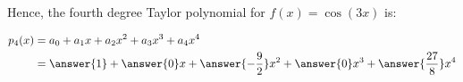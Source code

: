 \documentclass{ximera}
\begin{document}
\begin{exercise}
\begin{exercise}
Hence, the fourth degree Taylor polynomial for $f(x) = \cos(3x)$ is:

\begin{align*}
p_4(x) &=a_0+a_1x+a_2x^2+a_3x^3+a_4x^4 \\
&= \answer{1}+\answer{0}x+\answer{-\frac{9}{2}}x^2+\answer{0}x^3+\answer{\frac{27}{8}}x^4 \\
\end{align*}

\end{exercise}


\end{exercise}
\end{document}
